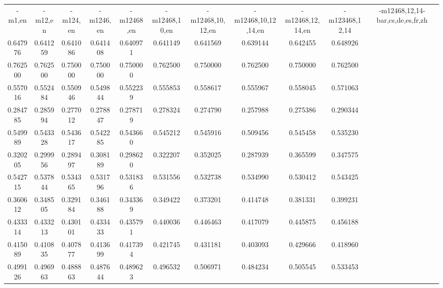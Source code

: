 \documentclass[11pt]{article}
\begin{document}
\begin{table*}[htbp]
  \centering
  \begin{tabular}{ccccccccccc}
  -m1,en & -m12,en  & -m124,en &-m1246,en &-m12468,en & -m12468,10,en & -m12468,10,12,en & -m12468,10,12,14,en & -m12468,12,14,en & -m123468,12,14 & -m12468,12,14-bar,cs,de,es,fr,zh     \\
0.647976 & 0.641259 & 0.641086 & 0.641408 & 0.640971 & 0.641149       & 0.641569         &         0.639144   & 0.642455 & 0.648926                &     \\       
0.762500 & 0.762500 & 0.750000 & 0.750000 & 0.750000 & 0.762500       & 0.750000         &         0.762500   & 0.750000 & 0.762500                &     \\       
0.557016 & 0.552484 & 0.550946 & 0.549844 & 0.552239 & 0.555853       & 0.558617         &         0.555967   & 0.558045 & 0.571063                &     \\       
0.284785 & 0.285994 & 0.277012 & 0.278847 & 0.278719 & 0.278324       & 0.274790         &         0.257988   & 0.275386 & 0.290344                &     \\       
0.549989 & 0.543328 & 0.543617 & 0.542285 & 0.543660 & 0.545212       & 0.545916         &         0.509456   & 0.545458 & 0.535230                &     \\       
0.320205 & 0.299956 & 0.289497 & 0.308189 & 0.298620 & 0.322207       & 0.352025         &         0.287939   & 0.365599 & 0.347575                &     \\       
0.542715 & 0.537844 & 0.534365 & 0.531796 & 0.531836 & 0.531556       & 0.532738         &         0.534990   & 0.530412 & 0.543425                &     \\       
0.360612 & 0.348505 & 0.329184 & 0.346188 & 0.343369 & 0.349422       & 0.373201         &         0.414748   & 0.381331 & 0.399231                &     \\       
0.433314 & 0.433213 & 0.430101 & 0.433433 & 0.435791 & 0.440036       & 0.446463         &         0.417079   & 0.445875 & 0.456188                &     \\       
0.415089 & 0.410835 & 0.407877 & 0.413699 & 0.417394 & 0.421745       & 0.431181         &         0.403093   & 0.429666 & 0.418960                &     \\       
0.499126 & 0.496963 & 0.488863 & 0.487644 & 0.489623 & 0.496532       & 0.506971         &         0.484234   & 0.505545 & 0.533453                &     \\       

\end{tabular}
\end{table*}
\end{document}
